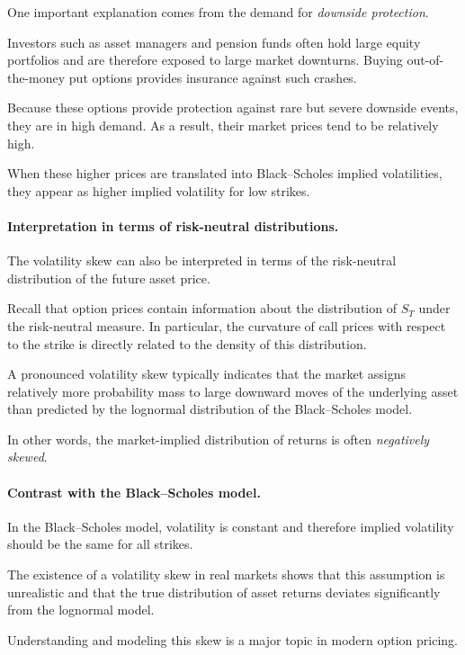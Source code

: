 \documentclass[11pt]{article}
\newcommand{\1}{\mathbf{1}}
\theoremstyle{plain}
\theoremstyle{definition}
\theoremstyle{remark}
\begin{document}
One important explanation comes from the demand for
\emph{downside protection}.

Investors such as asset managers and pension funds often hold large
equity portfolios and are therefore exposed to large market downturns.
Buying out-of-the-money put options provides insurance against such
crashes.

Because these options provide protection against rare but severe
downside events, they are in high demand.
As a result, their market prices tend to be relatively high.

When these higher prices are translated into Black--Scholes implied
volatilities, they appear as higher implied volatility for low strikes.

\paragraph{Interpretation in terms of risk-neutral distributions.}

The volatility skew can also be interpreted in terms of the
risk-neutral distribution of the future asset price.

Recall that option prices contain information about the distribution of
\(S_T\) under the risk-neutral measure.
In particular, the curvature of call prices with respect to the strike
is directly related to the density of this distribution.

A pronounced volatility skew typically indicates that the market
assigns relatively more probability mass to large downward moves of the
underlying asset than predicted by the lognormal distribution of the
Black--Scholes model.

In other words, the market-implied distribution of returns is often
\emph{negatively skewed}.

\paragraph{Contrast with the Black--Scholes model.}

In the Black--Scholes model, volatility is constant and therefore
implied volatility should be the same for all strikes.

The existence of a volatility skew in real markets shows that this
assumption is unrealistic and that the true distribution of asset
returns deviates significantly from the lognormal model.

Understanding and modeling this skew is a major topic in modern option
pricing.
\end{document}
